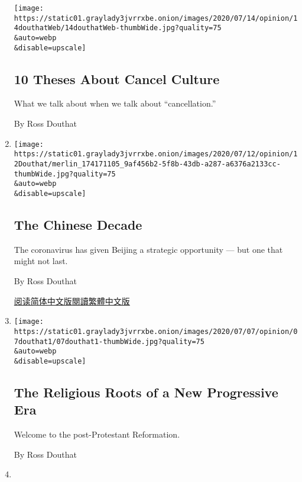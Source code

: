 \begin{enumerate}
  \texttt{[image: https://static01.graylady3jvrrxbe.onion/images/2020/07/14/opinion/14douthatWeb/14douthatWeb-thumbWide.jpg?quality=75\\\&auto=webp\\\&disable=upscale]}

  \hypertarget{10-theses-about-cancel-culture}{%
  \subsection{10 Theses About Cancel
  Culture}\label{10-theses-about-cancel-culture}}

  What we talk about when we talk about ``cancellation.''

  By Ross Douthat
\item
  \href{/2020/07/11/opinion/sunday/china-coronavirus-power.html}{}

  \texttt{[image: https://static01.graylady3jvrrxbe.onion/images/2020/07/12/opinion/12Douthat/merlin\_174171105\_9af456b2-5f8b-43db-a287-a6376a2133cc-thumbWide.jpg?quality=75\\\&auto=webp\\\&disable=upscale]}

  \hypertarget{the-chinese-decade}{%
  \subsection{The Chinese Decade}\label{the-chinese-decade}}

  The coronavirus has given Beijing a strategic opportunity --- but one
  that might not last.

  By Ross Douthat

  \href{https://cn.nytimes3xbfgragh.onion/opinion/20200713/china-coronavirus-power/}{阅读简体中文版}\href{https://cn.nytimes3xbfgragh.onion/opinion/20200713/china-coronavirus-power/zh-hant/}{閱讀繁體中文版}
\item
  \href{/2020/07/07/opinion/protestant-progressive-reformation.html}{}

  \texttt{[image: https://static01.graylady3jvrrxbe.onion/images/2020/07/07/opinion/07douthat1/07douthat1-thumbWide.jpg?quality=75\\\&auto=webp\\\&disable=upscale]}

  \hypertarget{the-religious-roots-of-a-new-progressive-era}{%
  \subsection{The Religious Roots of a New Progressive
  Era}\label{the-religious-roots-of-a-new-progressive-era}}

  Welcome to the post-Protestant Reformation.

  By Ross Douthat
\item
  \href{/2020/06/30/opinion/woodrow-wilson-princeton.html}{}


\end{enumerate}
